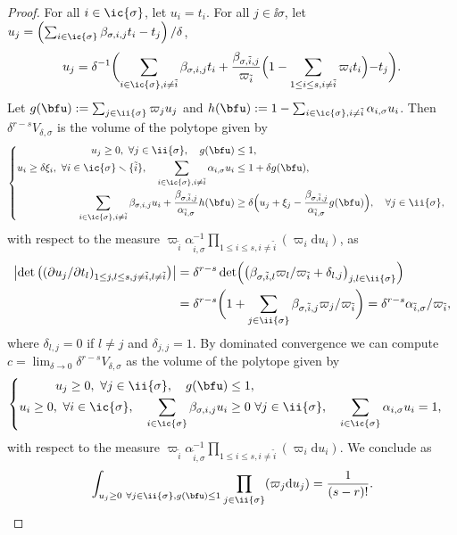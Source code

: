 \begin{proof}
For all $i\in\ic{\sigma}$, let $u_i=t_i$.
For all $j\in\ii{\sigma}$, let $u_j=\left(\sum_{i\in\ic{\sigma}} \beta_{\sigma, i,j}t_i -t_j \right)/\delta$, \ie \[
u_j
= \delta^{-1}\biggl(\sum_{i\in\ic{\sigma},i\neq\tilde i} \beta_{\sigma, i,j}t_i
+\frac{\beta_{\sigma,\tilde i , j}}{\varpi_{\tilde i}}
\Bigl(1- \sum_{1\leq i\leq s, i\neq \tilde i} \varpi_i t_i \Bigl) -t_j \biggr).
\]
Let $g(\bfu):=\sum_{j\in\ii{\sigma}}\varpi_j u_j$
and $h(\bfu):= 1-\sum_{i\in\ic{\sigma},i\neq \tilde i} \alpha_{i,\sigma}u_i$.
Then $\delta^{r-s}V_{\delta, \sigma}$ is the volume of the polytope given by
\[
\begin{cases}
\begin{aligned}
u_j\geq0, \ \forall j\in\ii{\sigma},
\quad
g(\bfu) &\leq 1,
\\
u_i\geq \delta\xi_i ,\ \forall i\in\ic{\sigma}\smallsetminus\{\tilde i\},
\quad
\sum_{ i\in\ic{\sigma},i\neq\tilde i} \alpha_{i,\sigma} u_i &\leq 1+\delta g(\bfu),
\\
\sum_{i\in\ic{\sigma}, i\neq\tilde i}\beta_{\sigma,i,j}u_i
+\frac{\beta_{\sigma,\tilde i,j}}{\alpha_{\tilde i,\sigma}}
h(\bfu)
&\geq \delta \Bigl(u_j+\xi_j-\frac{\beta_{\sigma,\tilde i,j}}{\alpha_{\tilde i,\sigma}} g(\bfu) \Bigr), \quad\forall j\in\ii{\sigma}, 
\end{aligned}
\end{cases}
\]
with respect to the measure
$\varpi_{\tilde i}\alpha_{\tilde i,\sigma}^{-1}
\prod_{1\leq i\leq s, i\neq\tilde i}(\varpi_i\mathrm du_i)$, as
\begin{align*}
\left|\det\left((\partial u_j/\partial t_l)_{1\leq j,l\leq s, j\neq\tilde i,l\neq\tilde i}\right)\right|
&=\delta^{r-s}\det\Bigl(\bigl(\beta_{\sigma, \tilde i, l}\varpi_l/\varpi_{\tilde i} + \delta_{l,j}\bigr)_{j,l\in\ii{\sigma}}\Bigr)\\
&=\delta^{r-s} \biggl(1+ \sum_{j\in\ii{\sigma}}\beta_{\sigma, \tilde i, j}\varpi_j/\varpi_{\tilde i} \biggr)
= \delta^{r-s}\alpha_{\tilde i,\sigma}/\varpi_{\tilde i},
\end{align*}
where $\delta_{l,j}=0$ if $l\neq j$ and $\delta_{j,j}=1$.
By dominated convergence
we can compute $c=\lim_{\delta\to 0}\delta^{r-s}V_{\delta, \sigma}$
as the volume of the polytope given by
\[
\begin{cases}
\begin{aligned}
u_j\geq0, \ \forall j\in\ii{\sigma},\quad
g(\bfu)&\leq 1, \\
u_i\geq0, \ \forall i\in\ic{\sigma},
\quad \sum_{i\in\ic{\sigma}}\beta_{\sigma,i,j}u_i&\geq 0 \ \forall j\in\ii{\sigma},
\quad \sum_{i\in\ic{\sigma}}\alpha_{i,\sigma}u_i=1,
\end{aligned}
\end{cases}
\]
with respect to the measure
$\varpi_{\tilde i}\alpha_{\tilde i,\sigma}^{-1}\prod_{1\leq i\leq s, i\neq\tilde i}(\varpi_i\mathrm du_i)$.
We conclude as
\[
\int_{u_j\geq0 \ \forall j\in\ii{\sigma}, g(\bfu)\leq 1}
\prod_{j\in\ii{\sigma}}(\varpi_j\mathrm d u_j)
=\frac{1}{(s-r)!}.
\qedhere
\]
\end{proof}


